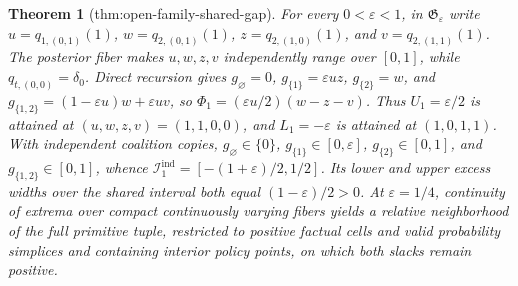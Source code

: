 \documentclass{article}
\newtheorem{theorem}{Theorem}
\begin{document}
\begin{theorem}[thm:open-family-shared-gap]\label{thm:open-family-shared-gap}
For every \(0<\varepsilon<1\), in \(\mathfrak G_{\varepsilon}\) write \(u=q_{1,(0,1)}(1)\), \(w=q_{2,(0,1)}(1)\), \(z=q_{2,(1,0)}(1)\), and \(v=q_{2,(1,1)}(1)\). The posterior fiber makes \(u,w,z,v\) independently range over \([0,1]\), while \(q_{t,(0,0)}=\delta_0\). Direct recursion gives \(g_{\varnothing}=0\), \(g_{\{1\}}=\varepsilon uz\), \(g_{\{2\}}=w\), and \(g_{\{1,2\}}=(1-\varepsilon u)w+\varepsilon uv\), so \(\Phi_1=(\varepsilon u/2)(w-z-v)\). Thus \(U_1=\varepsilon/2\) is attained at \((u,w,z,v)=(1,1,0,0)\), and \(L_1=-\varepsilon\) is attained at \((1,0,1,1)\). With independent coalition copies, \(g_{\varnothing}\in\{0\}\), \(g_{\{1\}}\in[0,\varepsilon]\), \(g_{\{2\}}\in[0,1]\), and \(g_{\{1,2\}}\in[0,1]\), whence \(\mathcal I_1^{\mathrm{ind}}=[-(1+\varepsilon)/2,1/2]\). Its lower and upper excess widths over the shared interval both equal \((1-\varepsilon)/2>0\). At \(\varepsilon=1/4\), continuity of extrema over compact continuously varying fibers yields a relative neighborhood of the full primitive tuple, restricted to positive factual cells and valid probability simplices and containing interior policy points, on which both slacks remain positive.
\end{theorem}
\end{document}
